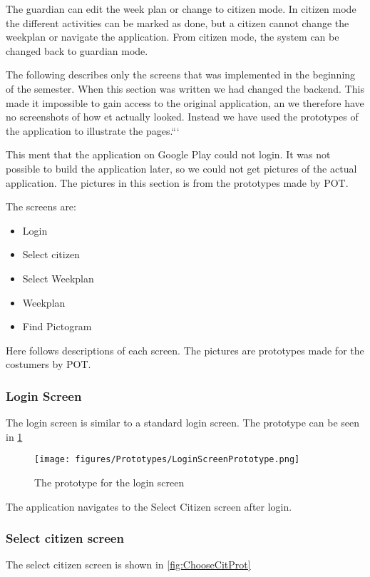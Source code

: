 The guardian can edit the week plan or change to citizen mode. In citizen mode the different activities can be marked as done, but a citizen cannot change the weekplan or navigate the application. From citizen mode, the system can be changed back to guardian mode.

The following describes only the screens that was implemented in the beginning of the semester. When this section was written we had changed the backend. This made it impossible to gain access to the original application, an we therefore have no screenshots of how et actually looked. Instead we have used the prototypes of the application to illustrate the pages.```

This ment that the application on Google Play could not login. It was not possible to build the application later, so we could not get pictures of the actual application. The pictures in this section is from the prototypes made by \gls{POT}.


The screens are:
\begin{itemize}
    \item Login
    \item Select citizen 
    \item Select Weekplan 
    \item Weekplan
    \item Find Pictogram
\end{itemize}

Here follows descriptions of each screen. The pictures are prototypes made for the costumers by \gls{POT}. 

\subsubsection*{Login Screen}
The login screen is similar to a standard login screen. The prototype can be seen in \ref{fig:LoginProt}

\begin{figure}[H]
    \begin{center}
        \texttt{[image: figures/Prototypes/LoginScreenPrototype.png]}
    \end{center}
    \caption{The prototype for the login screen}
    \label{fig:LoginProt}
\end{figure}
The application navigates to the Select Citizen screen after login. 

\subsubsection*{Select citizen screen}
The select citizen screen is shown in \ref{fig:ChooseCitProt}

